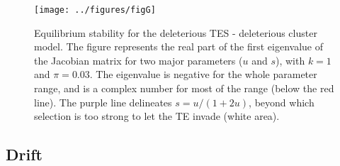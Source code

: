 \documentclass[10pt,a4paper]{article}
\begin{document}
\begin{figure}
\begin{adjustwidth}{-1in}{0in}
\begin{center}
	\texttt{[image: ../figures/figG]}
\caption{\label{fig:figG} Equilibrium stability for the deleterious TES - deleterious cluster model. The figure represents the real part of the first eigenvalue of the Jacobian matrix for two major parameters ($u$ and $s$), with $k=1$ and $\pi = 0.03$. The eigenvalue is negative for the whole parameter range, and is a complex number for most of the range (below the red line). The purple line delineates $s = u/(1+2u)$, beyond which selection is too strong to let the TE invade (white area). }
\end{center}\end{adjustwidth}
\end{figure}

\subsection{Drift}




\printbibliography


\newpage 
\end{document}

